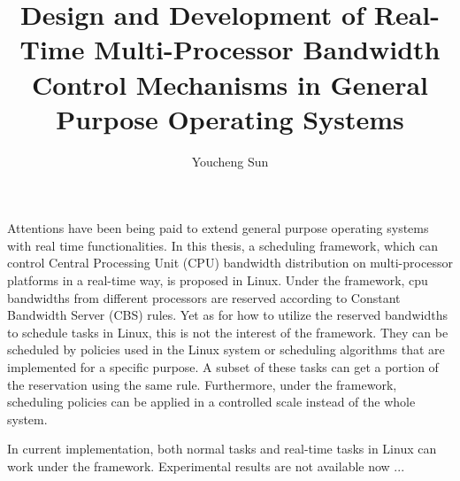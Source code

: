 \documentclass[a4paper, 12pt, openright, oneside, final]{book}%
\title{Design and Development of Real-Time Multi-Processor Bandwidth
  Control Mechanisms in General Purpose Operating Systems}
\author{Youcheng Sun}
\newcommand{\fncyblank}{\fancyhf{}}
\newenvironment{abstract}%
{\cleardoublepage\fncyblank\null\vfill\begin{center}%
\bfseries\abstractname\end{center}}%
{\vfill\null}
\begin{document}
\frontmatter

\maketitle

%

\begin{abstract}

  Attentions have been being paid to extend general purpose operating
  systems with real time functionalities. In this thesis, a scheduling
  framework, which can control Central Processing Unit (CPU) bandwidth
  distribution on multi-processor platforms in a real-time way, is
  proposed in Linux.  Under the framework, cpu bandwidths from
  different processors are reserved according to Constant Bandwidth
  Server (CBS) rules.  Yet as for how to utilize the reserved
  bandwidths to schedule tasks in Linux, this is not the interest of
  the framework. They can be scheduled by policies used in the Linux
  system or scheduling algorithms that are implemented for a specific
  purpose. A subset of these tasks can get a portion of the
  reservation using the same rule.  Furthermore, under the framework,
  scheduling policies can be applied in a controlled scale instead of
  the whole system.

  In current implementation, both normal tasks and real-time tasks in
  Linux can work under the framework. Experimental results are not
  available now ...
\end{abstract}

\tableofcontents

\mainmatter


%




\end{document}
